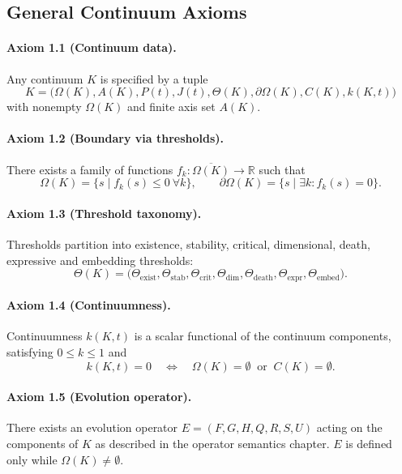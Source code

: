\subsection{General Continuum Axioms}

\paragraph{Axiom 1.1 (Continuum data).}
Any continuum \(K\) is specified by a tuple
\[
  K =
  \big(
    \Omega(K), A(K), P(t), J(t),
    \Theta(K), \partial\Omega(K), C(K), k(K,t)
  \big)
\]
with nonempty \(\Omega(K)\) and finite axis set \(A(K)\).

\paragraph{Axiom 1.2 (Boundary via thresholds).}
There exists a family of functions
\(f_k : \overline{\Omega(K)}\to\mathbb{R}\) such that
\[
  \Omega(K) = \big\{ s \mid f_k(s)\le 0 \ \forall k \big\},
  \qquad
  \partial\Omega(K) = \big\{ s \mid \exists k: f_k(s)=0 \big\}.
\]

\paragraph{Axiom 1.3 (Threshold taxonomy).}
Thresholds partition into existence, stability, critical, dimensional, death,
expressive and embedding thresholds:
\[
  \Theta(K) =
  \big(
    \Theta_{\mathrm{exist}},
    \Theta_{\mathrm{stab}},
    \Theta_{\mathrm{crit}},
    \Theta_{\mathrm{dim}},
    \Theta_{\mathrm{death}},
    \Theta_{\mathrm{expr}},
    \Theta_{\mathrm{embed}}
  \big).
\]

\paragraph{Axiom 1.4 (Continuumness).}
Continuumness \(k(K,t)\) is a scalar functional of the continuum components,
satisfying \(0\le k\le 1\) and
\[
  k(K,t) = 0 \quad\Longleftrightarrow\quad
  \Omega(K) = \emptyset
  \ \text{ or }\
  C(K)=\emptyset.
\]

\paragraph{Axiom 1.5 (Evolution operator).}
There exists an evolution operator
\(E = (F,G,H,Q,R,S,U)\) acting on the components of \(K\) as described in
the operator semantics chapter.  \(E\) is defined only while
\(\Omega(K)\neq\emptyset\).

